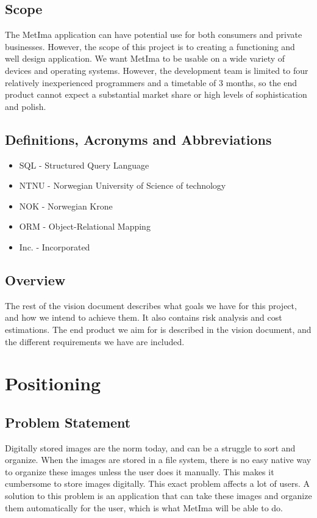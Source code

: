 \documentclass{article}
\begin{document}
\subsection{Scope}
The MetIma application can have potential use for both  consumers and private businesses. However, the scope of this project is to creating a functioning and well design application. We want MetIma to be usable on a wide variety of devices and operating systems. However, the development team is limited to four relatively inexperienced programmers and a timetable of 3 months, so the end product cannot expect a substantial market share or high levels of sophistication and polish.  
\subsection{Definitions, Acronyms and Abbreviations}
\begin{itemize}
    \item SQL - Structured Query Language
    \item NTNU - Norwegian University of Science of technology
    \item NOK - Norwegian Krone
    \item ORM - Object-Relational Mapping
    \item Inc. - Incorporated
    
\end{itemize}{}
\subsection{Overview}
The rest of the vision document describes what goals we have for this project, and how we intend to achieve them. It also contains risk analysis and cost estimations. The end product we aim for is described in the vision document, and the different requirements we have are included.

\section{Positioning}
\subsection{Problem Statement}
Digitally stored images are the norm today, and can be a struggle to sort and organize. When the images are stored in a file system, there is no easy native way to organize these images unless the user does it manually. This makes it cumbersome to store images digitally. This exact problem affects a lot of users. A solution to this problem is an application that can take these images and organize them automatically for the user, which is what MetIma will be able to do. 
\end{document}
